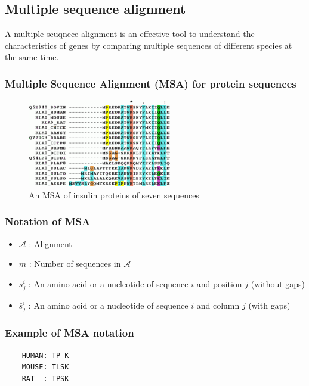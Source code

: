 %
%

%
%
\subsection{Multiple sequence alignment}
A multiple seuqnece alignment is an effective tool to understand the characteristics of genes by comparing multiple sequences of different species at the same time.

%
%
\subsubsection*{Multiple Sequence Alignment (MSA) for protein sequences}
\begin{figure}[H]
  \centering
      \includegraphics[width=0.3 \textwidth]{fig08/msa_part.png}
  \caption{An MSA of insulin proteins of seven sequences}
\end{figure}

%
%
\subsubsection*{Notation of MSA}
\begin{itemize}
\item $\mathcal{A}$ : Alignment
\item $m$ : Number of sequences in $\mathcal{A}$
\item $s_j^i$ : An amino acid or a nucleotide of sequence $i$ and position $j$ (without gaps)
\item $\bar{s}_j^i$ : An amino acid or a nucleotide of sequence $i$ and column $j$ (with gaps)
\end{itemize}

%
%
\subsubsection*{Example of MSA notation}
\begin{verbatim}
    HUMAN: TP-K
    MOUSE: TLSK
    RAT  : TPSK
\end{verbatim}

